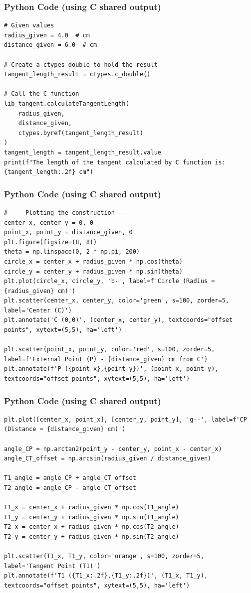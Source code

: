 \documentclass{beamer}
\begin{document}
\begin{frame}[fragile]
\frametitle{Python Code (using C shared output)}
\begin{lstlisting}
# Given values
radius_given = 4.0  # cm
distance_given = 6.0  # cm

# Create a ctypes double to hold the result
tangent_length_result = ctypes.c_double()

# Call the C function
lib_tangent.calculateTangentLength(
    radius_given,
    distance_given,
    ctypes.byref(tangent_length_result)
)
tangent_length = tangent_length_result.value
print(f"The length of the tangent calculated by C function is: {tangent_length:.2f} cm")
\end{lstlisting}
\end{frame}

\begin{frame}[fragile]
\frametitle{Python Code (using C shared output)}
\begin{lstlisting}
# --- Plotting the construction ---
center_x, center_y = 0, 0
point_x, point_y = distance_given, 0
plt.figure(figsize=(8, 8))
theta = np.linspace(0, 2 * np.pi, 200)
circle_x = center_x + radius_given * np.cos(theta)
circle_y = center_y + radius_given * np.sin(theta)
plt.plot(circle_x, circle_y, 'b-', label=f'Circle (Radius = {radius_given} cm)')
plt.scatter(center_x, center_y, color='green', s=100, zorder=5, label='Center (C)')
plt.annotate('C (0,0)', (center_x, center_y), textcoords="offset points", xytext=(5,5), ha='left')

plt.scatter(point_x, point_y, color='red', s=100, zorder=5, label=f'External Point (P) - {distance_given} cm from C')
plt.annotate(f'P ({point_x},{point_y})', (point_x, point_y), textcoords="offset points", xytext=(5,5), ha='left')
\end{lstlisting}
\end{frame}

\begin{frame}[fragile]
\frametitle{Python Code (using C shared output)}
\begin{lstlisting}
plt.plot([center_x, point_x], [center_y, point_y], 'g--', label=f'CP (Distance = {distance_given} cm)')

angle_CP = np.arctan2(point_y - center_y, point_x - center_x)
angle_CT_offset = np.arcsin(radius_given / distance_given)

T1_angle = angle_CP + angle_CT_offset
T2_angle = angle_CP - angle_CT_offset

T1_x = center_x + radius_given * np.cos(T1_angle)
T1_y = center_y + radius_given * np.sin(T1_angle)
T2_x = center_x + radius_given * np.cos(T2_angle)
T2_y = center_y + radius_given * np.sin(T2_angle)

plt.scatter(T1_x, T1_y, color='orange', s=100, zorder=5, label='Tangent Point (T1)')
plt.annotate(f'T1 ({T1_x:.2f},{T1_y:.2f})', (T1_x, T1_y), textcoords="offset points", xytext=(5,5), ha='left')
\end{lstlisting}
\end{frame}
\end{document}
